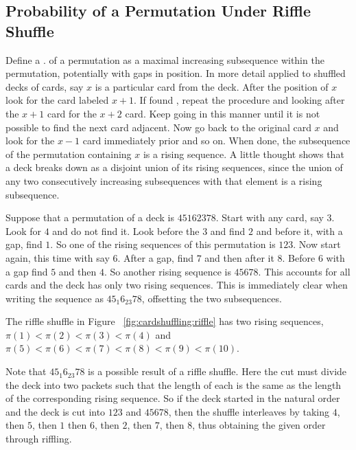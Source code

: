 \documentclass[12pt]{article}
\begin{document}
\subsection*{Probability of a Permutation Under Riffle Shuffle}

Define a
.%
of a permutation as a maximal increasing subsequence
within the permutation, potentially with gaps in position.  In
more detail applied to shuffled decks of cards, say \( x \) is a
particular card from the deck.   After the position of \( x \)
look for the card labeled \( x+1 \).
If found , repeat the procedure and looking after the \( x+1 \) card for
the \( x+2 \) card.  Keep going in this manner until it is not possible
to find the next card adjacent.  Now go back to the original card \( x \) and
look for the \( x-1 \) card immediately prior and so on.  When done,
the subsequence of the permutation containing \( x \)  is a rising
sequence.  A little thought shows that a deck breaks down as a disjoint
union of its rising sequences, since the union of any two consecutively
increasing subsequences with that element is a rising subsequence.

\begin{example}
    Suppose that a permutation of a deck is \( 45162378 \).  Start with
    any card, say \( 3 \).  Look for \( 4 \) and do not find it.  Look
    before the \( 3 \) and find \( 2 \) and before it, with a gap, find \( 1 \).  So
    one of the rising sequences of this permutation is \( 123 \).  Now
    start again, this time with say \( 6 \).  After a gap, find \( 7 \) and then
    after it \( 8 \).  Before \( 6 \) with a gap find \( 5 \) and then \( 4 \).  So
    another rising sequence is \( 45678 \).  This accounts for all cards
    and the deck has only two rising sequences.  This is immediately
    clear when writing the sequence as \( 45_{1}6_{23}78 \), offsetting
    the two subsequences.
\end{example}

\begin{example}
    The riffle shuffle in Figure~%
    \ref{fig:cardshuffling:riffle} has two rising sequences, \( \pi(1) <
    \pi(2) < \pi(3) < \pi(4) \) and \( \pi(5) < \pi(6) < \pi(7) < \pi(8)
    < \pi(9) < \pi(10) \).
\end{example}

\begin{example}
    Note that \( 45_{1}6_{23}78 \) is a possible result of a riffle
    shuffle. Here the cut must divide the deck into two packets such
    that the length of each is the same as the length of the
    corresponding rising sequence.  So if the deck started in the
    natural order and the deck is cut into \( 123 \) and \( 45678 \),
    then the shuffle interleaves by taking \( 4 \), then \( 5 \), then \(
    1 \) then \( 6 \), then \( 2 \), then \( 7 \), then \( 8 \), thus
    obtaining the given order through riffling.
\end{example}
\end{document}
